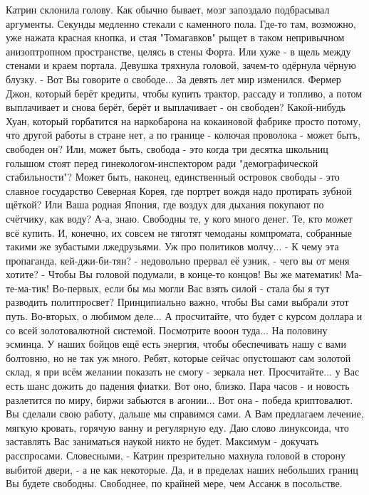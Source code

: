 Катрин склонила голову. Как обычно бывает, мозг запоздало подбрасывал аргументы. Секунды медленно стекали с каменного пола.
Где-то там, возможно, уже нажата красная кнопка, и стая "Томагавков" рыщет в таком непривычном анизоптропном пространстве, целясь в стены Форта. Или хуже - в щель между стенами и краем портала. Девушка тряхнула головой, зачем-то одёрнула чёрную блузку.
- Вот Вы говорите о свободе... За девять лет мир изменился. Фермер Джон, который берёт кредиты, чтобы купить трактор, рассаду и топливо, а потом выплачивает и снова берёт, берёт и выплачивает - он свободен? Какой-нибудь Хуан, который горбатится на наркобарона на кокаиновой фабрике просто потому, что другой работы в стране нет, а по границе - колючая проволока - может быть, свободен он? Или, может быть, свобода - это когда три десятка школьниц голышом стоят перед гинекологом-инспектором ради "демографической стабильности"? Может быть, наконец, единственный островок свободы - это славное государство Северная Корея, где портрет вождя надо протирать зубной щёткой? Или Ваша родная Япония, где воздух для дыхания покупают по счётчику, как воду? А-а, знаю. Свободны те, у кого много денег. Те, кто может всё купить. И, конечно, их совсем не тяготят чемоданы компромата, собранные такими же зубастыми лжедрузьями. Уж про политиков молчу...
- К чему эта пропаганда, кей-джи-би-тян? - недовольно прервал её узник, - чего вы от меня хотите?
- Чтобы Вы головой подумали, в конце-то концов! Вы же математик! Ма-те-ма-тик! Во-первых, если бы мы могли Вас взять силой - стала бы я тут разводить политпросвет? Принципиально важно, чтобы Вы сами выбрали этот путь. Во-вторых, о любимом деле... А просчитайте, что будет с курсом доллара и со всей золотовалютной системой. Посмотрите вооон туда... На половину эсминца. У наших бойцов ещё есть энергия, чтобы обеспечивать нашу с вами болтовню, но не так уж много. Ребят, которые сейчас опустошают сам золотой склад, я при всём желании показать не смогу - зеркала нет. Просчитайте... у Вас есть шанс дожить до падения фиатки. Вот оно, близко. Пара часов - и новость разлетится по миру, биржи забьются в агонии... Вот она - победа криптовалют. Вы сделали свою работу, дальше мы справимся сами. А Вам предлагаем лечение, мягкую кровать, горячую ванну и регулярную еду. Даю слово линуксоида, что заставлять Вас заниматься наукой никто не будет. Максимум - докучать расспросами. Словесными, - Катрин презрительно махнула головой в сторону выбитой двери, - а не как некоторые. Да, и в пределах наших небольших границ Вы будете свободны. Свободнее, по крайней мере, чем Ассанж в посольстве.

